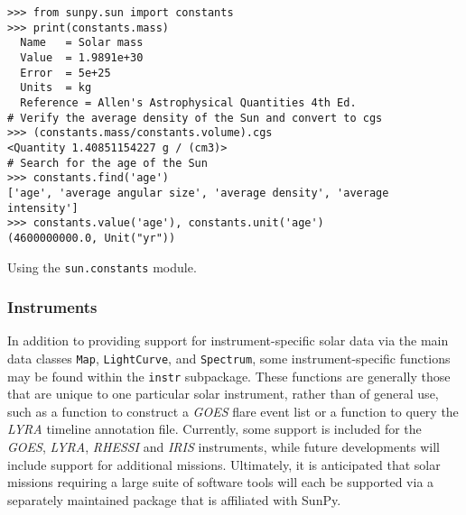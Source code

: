 \begin{listing}[H]
\begin{verbatim}
>>> from sunpy.sun import constants
>>> print(constants.mass)
  Name   = Solar mass
  Value  = 1.9891e+30
  Error  = 5e+25
  Units  = kg
  Reference = Allen's Astrophysical Quantities 4th Ed.
# Verify the average density of the Sun and convert to cgs
>>> (constants.mass/constants.volume).cgs
<Quantity 1.40851154227 g / (cm3)>
# Search for the age of the Sun
>>> constants.find('age')
['age', 'average angular size', 'average density', 'average intensity']
>>> constants.value('age'), constants.unit('age')
(4600000000.0, Unit("yr"))
\end{verbatim}
\caption{Using the \texttt{sun.constants} module.}
\label{code:constants_code}
\end{listing}
	
\subsubsection{Instruments}\label{ssec:util:inst}
In addition to providing support for instrument-specific solar data via the main data 
classes \texttt{Map}, \texttt{LightCurve}, and \texttt{Spectrum}, 
some instrument-specific functions may be found within the \texttt{instr} subpackage. 
These functions are generally those that are unique to one particular solar instrument, 
rather than of general use, such as a function to construct a \textit{GOES} flare event list 
or a function to query the \textit{LYRA} timeline annotation file. Currently, some support is included
 for the \textit{GOES}, \textit{LYRA}, \textit{RHESSI} and \textit{IRIS} instruments, while future developments 
 will include support for additional missions. Ultimately, it is anticipated that solar
  missions requiring a large suite of software tools will each be supported via a separately 
  maintained package that is affiliated with SunPy.

